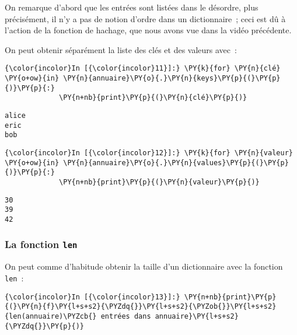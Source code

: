     On remarque d'abord que les entrées sont listées dans le désordre, plus
précisément, il n'y a pas de notion d'ordre dans un dictionnaire~; ceci
est dû à l'action de la fonction de hachage, que nous avons vue dans la
vidéo précédente.

    On peut obtenir séparément la liste des clés et des valeurs avec~:

    \begin{Verbatim}[commandchars=\\\{\},frame=single,framerule=0.3mm,rulecolor=\color{cellframecolor}]
{\color{incolor}In [{\color{incolor}11}]:} \PY{k}{for} \PY{n}{clé} \PY{o+ow}{in} \PY{n}{annuaire}\PY{o}{.}\PY{n}{keys}\PY{p}{(}\PY{p}{)}\PY{p}{:}
             \PY{n+nb}{print}\PY{p}{(}\PY{n}{clé}\PY{p}{)}
\end{Verbatim}


    \begin{Verbatim}[commandchars=\\\{\},frame=single,framerule=0.3mm,rulecolor=\color{cellframecolor}]
alice
eric
bob
\end{Verbatim}

    \begin{Verbatim}[commandchars=\\\{\},frame=single,framerule=0.3mm,rulecolor=\color{cellframecolor}]
{\color{incolor}In [{\color{incolor}12}]:} \PY{k}{for} \PY{n}{valeur} \PY{o+ow}{in} \PY{n}{annuaire}\PY{o}{.}\PY{n}{values}\PY{p}{(}\PY{p}{)}\PY{p}{:}
             \PY{n+nb}{print}\PY{p}{(}\PY{n}{valeur}\PY{p}{)}
\end{Verbatim}


    \begin{Verbatim}[commandchars=\\\{\},frame=single,framerule=0.3mm,rulecolor=\color{cellframecolor}]
30
39
42
\end{Verbatim}

    \hypertarget{la-fonction-len}{%
\subsubsection{\texorpdfstring{La fonction
\texttt{len}}{La fonction len}}\label{la-fonction-len}}

    On peut comme d'habitude obtenir la taille d'un dictionnaire avec la
fonction \texttt{len}~:

    \begin{Verbatim}[commandchars=\\\{\},frame=single,framerule=0.3mm,rulecolor=\color{cellframecolor}]
{\color{incolor}In [{\color{incolor}13}]:} \PY{n+nb}{print}\PY{p}{(}\PY{n}{f}\PY{l+s+s2}{\PYZdq{}}\PY{l+s+s2}{\PYZob{}}\PY{l+s+s2}{len(annuaire)\PYZcb{} entrées dans annuaire}\PY{l+s+s2}{\PYZdq{}}\PY{p}{)}
\end{Verbatim}


